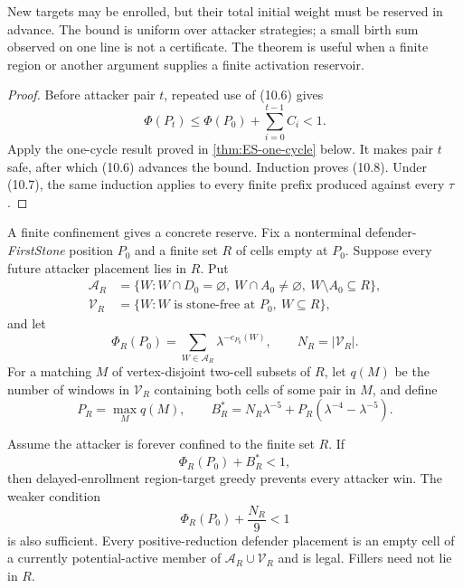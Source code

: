 \begin{plainterms}
New targets may be enrolled, but their total initial weight must be reserved
in advance.  The bound is uniform over attacker strategies; a small birth sum
observed on one line is not a certificate.  The theorem is useful when a
finite region or another argument supplies a finite activation reservoir.
\end{plainterms}

\begin{proof}
Before attacker pair $t$, repeated use of \textup{(10.6)} gives
\[
 \Phi(P_t)\leq\Phi(P_0)+\sum_{i=0}^{t-1}C_i<1.
\]
Apply the one-cycle result proved in \cref{thm:ES-one-cycle} below.  It makes
pair $t$ safe, after which \textup{(10.6)} advances the bound.  Induction proves
\textup{(10.8)}.  Under \textup{(10.7)}, the same induction applies to every
finite prefix produced against every $\tau$.
\end{proof}

A finite confinement gives a concrete reserve.  Fix a nonterminal
defender-\emph{FirstStone} position $P_0$ and a finite set $R$ of cells empty
at $P_0$.  Suppose every future attacker placement lies in $R$.  Put
\[
\begin{aligned}
 \mathcal A_R&=\{W:W\cap D_0=\varnothing,
   \ W\cap A_0\ne\varnothing,\ W\setminus A_0\subseteq R\},\\
 \mathcal V_R&=\{W:W\text{ is stone-free at }P_0,\ W\subseteq R\},
\end{aligned}
\tag{10.9}
\]
and let
\[
 \Phi_R(P_0)=\sum_{W\in\mathcal A_R}
       \lambda^{-e_{P_0}(W)},
 \qquad N_R=|\mathcal V_R|.
\]
For a matching $M$ of vertex-disjoint two-cell subsets of $R$, let $q(M)$ be
the number of windows in $\mathcal V_R$ containing both cells of some pair in
$M$, and define
\[
 P_R=\max_M q(M),\qquad
 B_R^*=N_R\lambda^{-5}
       +P_R(\lambda^{-4}-\lambda^{-5}).
\tag{10.10}
\]

\begin{theorem}
\label{thm:ES-finite-region}
Assume the attacker is forever confined to the finite set $R$.  If
\[
 \Phi_R(P_0)+B_R^*<1,
\tag{10.11}
\]
then delayed-enrollment region-target greedy prevents every attacker win.  The
weaker condition
\[
 \Phi_R(P_0)+\frac{N_R}{9}<1
\tag{10.12}
\]
is also sufficient.  Every positive-reduction defender placement is an empty
 cell of a currently potential-active member of
$\mathcal A_R\cup\mathcal V_R$ and is legal.  Fillers need not lie in $R$.
\end{theorem}

